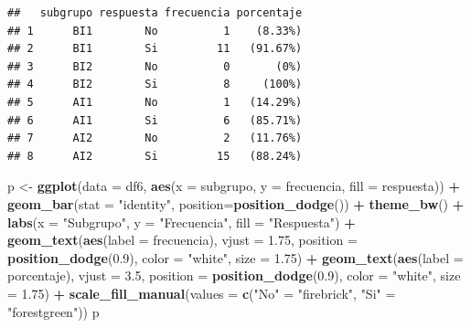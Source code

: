 \documentclass[
]{article}
\newenvironment{Shaded}{\begin{snugshade}}{\end{snugshade}}
\newcommand{\AttributeTok}[1]{\textcolor[rgb]{0.13,0.29,0.53}{#1}}
\newcommand{\FloatTok}[1]{\textcolor[rgb]{0.00,0.00,0.81}{#1}}
\newcommand{\FunctionTok}[1]{\textcolor[rgb]{0.13,0.29,0.53}{\textbf{#1}}}
\newcommand{\NormalTok}[1]{#1}
\newcommand{\OtherTok}[1]{\textcolor[rgb]{0.56,0.35,0.01}{#1}}
\newcommand{\SpecialCharTok}[1]{\textcolor[rgb]{0.81,0.36,0.00}{\textbf{#1}}}
\newcommand{\StringTok}[1]{\textcolor[rgb]{0.31,0.60,0.02}{#1}}
\begin{document}
\begin{verbatim}
##   subgrupo respuesta frecuencia porcentaje
## 1      BI1        No          1    (8.33%)
## 2      BI1        Si         11   (91.67%)
## 3      BI2        No          0       (0%)
## 4      BI2        Si          8     (100%)
## 5      AI1        No          1   (14.29%)
## 6      AI1        Si          6   (85.71%)
## 7      AI2        No          2   (11.76%)
## 8      AI2        Si         15   (88.24%)
\end{verbatim}

\begin{Shaded}
\begin{Highlighting}[]
\NormalTok{p }\OtherTok{\textless{}{-}} \FunctionTok{ggplot}\NormalTok{(}\AttributeTok{data =}\NormalTok{ df6, }\FunctionTok{aes}\NormalTok{(}\AttributeTok{x =}\NormalTok{ subgrupo, }\AttributeTok{y =}\NormalTok{ frecuencia, }\AttributeTok{fill =}\NormalTok{ respuesta)) }\SpecialCharTok{+} 
  \FunctionTok{geom\_bar}\NormalTok{(}\AttributeTok{stat =} \StringTok{"identity"}\NormalTok{, }\AttributeTok{position=}\FunctionTok{position\_dodge}\NormalTok{()) }\SpecialCharTok{+}
  \FunctionTok{theme\_bw}\NormalTok{() }\SpecialCharTok{+} \FunctionTok{labs}\NormalTok{(}\AttributeTok{x =} \StringTok{"Subgrupo"}\NormalTok{, }\AttributeTok{y =} \StringTok{"Frecuencia"}\NormalTok{, }\AttributeTok{fill =} \StringTok{"Respuesta"}\NormalTok{) }\SpecialCharTok{+}
  \FunctionTok{geom\_text}\NormalTok{(}\FunctionTok{aes}\NormalTok{(}\AttributeTok{label =}\NormalTok{ frecuencia), }\AttributeTok{vjust =} \FloatTok{1.75}\NormalTok{, }\AttributeTok{position =} \FunctionTok{position\_dodge}\NormalTok{(}\FloatTok{0.9}\NormalTok{), }
            \AttributeTok{color =} \StringTok{"white"}\NormalTok{, }\AttributeTok{size =} \FloatTok{1.75}\NormalTok{) }\SpecialCharTok{+}
  \FunctionTok{geom\_text}\NormalTok{(}\FunctionTok{aes}\NormalTok{(}\AttributeTok{label =}\NormalTok{ porcentaje), }\AttributeTok{vjust =} \FloatTok{3.5}\NormalTok{, }\AttributeTok{position =} \FunctionTok{position\_dodge}\NormalTok{(}\FloatTok{0.9}\NormalTok{), }
            \AttributeTok{color =} \StringTok{"white"}\NormalTok{, }\AttributeTok{size =} \FloatTok{1.75}\NormalTok{) }\SpecialCharTok{+}
  \FunctionTok{scale\_fill\_manual}\NormalTok{(}\AttributeTok{values =} \FunctionTok{c}\NormalTok{(}\StringTok{"No"} \OtherTok{=} \StringTok{"firebrick"}\NormalTok{, }\StringTok{"Si"} \OtherTok{=} \StringTok{"forestgreen"}\NormalTok{))}
\NormalTok{p}
\end{Highlighting}
\end{Shaded}
\end{document}
